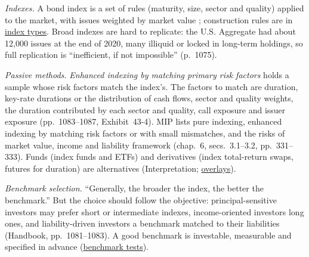 \begin{qfmethod}\label{meth:bond-index-exposure-benchmarks}
 \emph{Indexes.} A bond index is a set of rules (maturity, size, sector and quality) applied to the market, with issues weighted by market value \citep[chap.~43, p.~1081]{s7-fabozzifixed}; construction rules are in \hyperref[def:equity-fixed-income-index-types]{index types}. Broad indexes are hard to replicate: the U.S. Aggregate had about 12{,}000 issues at the end of 2020, many illiquid or locked in long-term holdings, so full replication is ``inefficient, if not impossible'' (p.~1075).

\emph{Passive methods.} \emph{Enhanced indexing by matching primary risk factors} holds a sample whose risk factors match the index's. The factors to match are duration, key-rate durations or the distribution of cash flows, sector and quality weights, the duration contributed by each sector and quality, call exposure and issuer exposure (pp.~1083--1087, Exhibit~43-4). MIP lists pure indexing, enhanced indexing by matching risk factors or with small mismatches, and the risks of market value, income and liability framework (chap.~6, secs.~3.1--3.2, pp.~331--333). Funds (index funds and ETFs) and derivatives (index total-return swaps, futures for duration) are alternatives (Interpretation; \hyperref[meth:forward-commitment-risk-overlays]{overlays}).

\emph{Benchmark selection.} ``Generally, the broader the index, the better the benchmark.'' But the choice should follow the objective: principal-sensitive investors may prefer short or intermediate indexes, income-oriented investors long ones, and liability-driven investors a benchmark matched to their liabilities (Handbook, pp.~1081--1083). A good benchmark is investable, measurable and specified in advance (\hyperref[meth:benchmark-selection-quality]{benchmark tests}).


\end{qfmethod}
